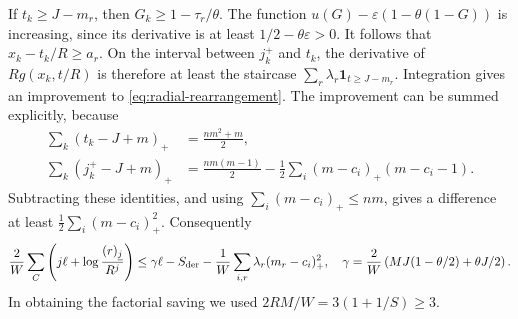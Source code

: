 If $t_k\geq J-m_r$, then $G_k\geq1-\tau_r/\theta$.
The function
$u(G)-\varepsilon(1-\theta(1-G))$ is increasing, since its derivative
is at least $1/2-\theta\varepsilon>0$.
It follows that $x_k-t_k/R\geq a_r$. On the interval between
$j_k^+$ and $t_k$, the derivative of $Rg(x_k,t/R)$ is therefore at
least the staircase
$\sum_r\lambda_r\boldsymbol1_{t\geq J-m_r}$.
Integration gives an improvement to \eqref{eq:radial-rearrangement}.
The improvement can be summed explicitly, because
\begin{align*}
 \sum_k(t_k-J+m)_+&=\frac{nm^2+m}{2},\\
 \sum_k(j_k^+-J+m)_+
 &=\frac{nm(m-1)}2
       -\frac12\sum_i(m-c_i)_+(m-c_i-1).
\end{align*}
Subtracting these identities, and using
$\sum_i(m-c_i)_+\leq nm$, gives a difference at least
$\frac12\sum_i(m-c_i)_+^2$. Consequently
\begin{equation}\label{eq:radial-derivative-coupled}
 \frac2W\sum_C\left(j\ell+\log\frac{(r)_{\underline{j}}}{R^j}\right)
 \leq\gamma\ell-S_{\rm der}
       -\frac1W\sum_{i,r}\lambda_r(m_r-c_i)_+^2,
 \quad
 \gamma=\frac2W\left(MJ(1-\theta/2)+\theta J/2\right).
\end{equation}
In obtaining the factorial saving we used $2RM/W=3(1+1/S)\geq3$.

